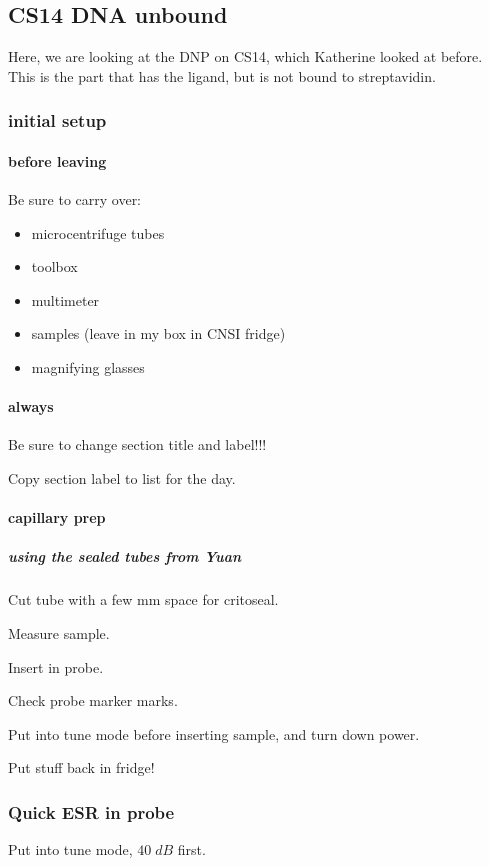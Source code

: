 \subsection{CS14 DNA unbound}\label{sec:dna_cs14_unbounddna}
\timeblockstart
{}
Here, we are looking at the DNP on CS14, which Katherine looked at before.
This is the part that has the ligand, but is not bound to streptavidin.

\subsubsection{initial setup}
\paragraph{before leaving}
Be sure to carry over:
\begin{itemize}
    \item microcentrifuge tubes
    \item toolbox 
    \item multimeter 
    \item samples (leave in my box in CNSI fridge)
    \item magnifying glasses
\end{itemize}

\paragraph{always}
Be sure to change section title and label!!!

Copy section label to list for the day.

\paragraph{capillary prep}
\subparagraph{using the sealed tubes from Yuan}
Cut tube with a few mm space for critoseal.

Measure sample.

Insert in probe.

Check probe marker marks.

Put into tune mode before inserting sample, and turn down power.

Put stuff back in fridge!

\subsubsection{Quick ESR in probe}
Put into tune mode, $40\;dB$ first.

